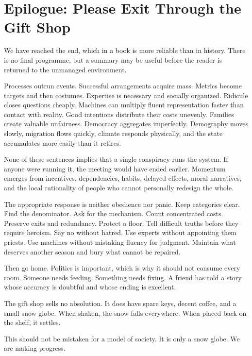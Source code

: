 \documentclass[12pt,a4paper]{book}
\begin{document}
\backmatter

\chapter*{Epilogue: Please Exit Through the Gift Shop}

We have reached the end, which in a book is more reliable than in history.
There is no final programme, but a summary may be useful before the reader is
returned to the unmanaged environment.

Processes outrun events.  Successful arrangements acquire mass.  Metrics
become targets and then costumes.  Expertise is necessary and socially
organized.  Ridicule closes questions cheaply.  Machines can multiply fluent
representation faster than contact with reality.  Good intentions distribute
their costs unevenly.  Families create valuable unfairness.  Democracy
aggregates imperfectly.  Demography moves slowly, migration flows quickly,
climate responds physically, and the state accumulates more easily than it
retires.

None of these sentences implies that a single conspiracy runs the system.  If
anyone were running it, the meeting would have ended earlier.  Momentum emerges
from incentives, dependencies, habits, delayed effects, moral narratives, and
the local rationality of people who cannot personally redesign the whole.

The appropriate response is neither obedience nor panic.  Keep categories
clear.  Find the denominator.  Ask for the mechanism.  Count concentrated
costs.  Preserve exits and redundancy.  Protect a floor.  Tell difficult truths
before they require heroism.  Say no without hatred.  Use experts without
appointing them priests.  Use machines without mistaking fluency for judgment.
Maintain what deserves another season and bury what cannot be repaired.

Then go home.  Politics is important, which is why it should not consume every
room.  Someone needs feeding.  Something needs fixing.  A friend has told a
story whose accuracy is doubtful and whose ending is excellent.

The gift shop sells no absolution.  It does have spare keys, decent coffee, and
a small snow globe.  When shaken, the snow falls everywhere.  When placed back
on the shelf, it settles.

This should not be mistaken for a model of society.  It is only a snow globe.
We are making progress.



\end{document}
